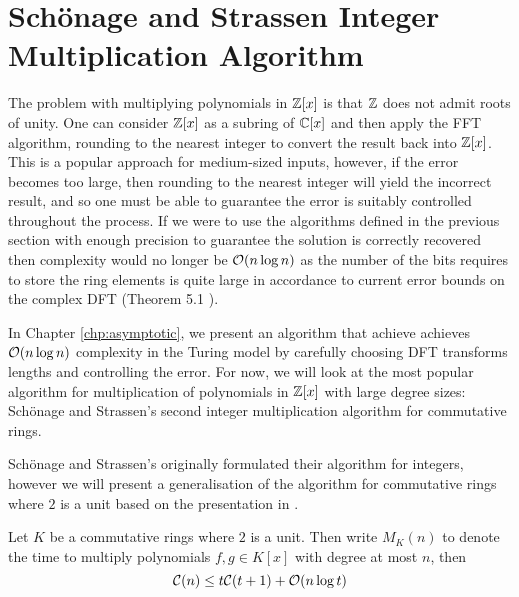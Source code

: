 \section{Sch\"{o}nage and Strassen Integer Multiplication Algorithm}
\label{sec:schon-strass}

The problem with multiplying polynomials in ${\mathbb Z}[x]$ is that ${\mathbb Z}$ does not admit roots of unity. One can consider ${\mathbb Z}[x]$ as a subring of ${\mathbb C}[x]$ and then apply the FFT algorithm, rounding to the nearest integer to convert the result back into ${\mathbb Z}[x]$. This is a popular approach for medium-sized inputs, however, if the error becomes too large, then rounding to the nearest integer will yield the incorrect result, and so one must be able to guarantee the error is suitably controlled throughout the process. If we were to use the algorithms defined in the previous section with enough precision to guarantee the solution is correctly recovered then complexity would no longer be $\mathcal O(n \log n)$ as the number of the bits requires to store the ring elements is quite large in accordance to current error bounds on the complex DFT (Theorem 5.1 \cite{fft-error}).

In Chapter \ref{chp:asymptotic}, we present an algorithm that achieve achieves $\mathcal O(n\log n)$ complexity in the Turing model by carefully choosing DFT transforms lengths and controlling the error. For now, we will look at the most popular algorithm for multiplication of polynomials in ${\mathbb Z}[x]$ with large degree sizes: Sch\"{o}nage and Strassen's second integer multiplication algorithm for commutative rings. 

Sch\"{o}nage and Strassen's originally formulated their algorithm for integers, however we will present a generalisation of the algorithm for commutative rings where $2$ is a unit based on the presentation in \cite{modern-comp-alg}.

\medskip



\begin{proposition}\label{prop:ss-formula}
    Let $K$ be a commutative rings where $2$ is a unit. Then write $M_K(n)$ to denote the time to multiply polynomials $f, g \in K[x]$ with degree at most $n$, then
    \[
        \mathcal C(n) \le t\mathcal C(t + 1) + \mathcal O(n\log t)
    \]
\end{proposition}

